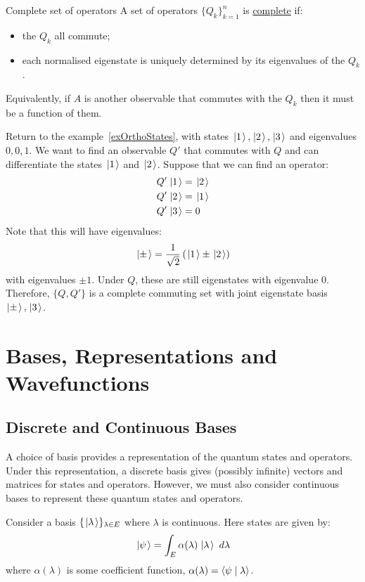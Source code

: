 \documentclass[../Main.tex]{subfiles}
\begin{document}
\begin{definition}{Complete set of operators}
    A set of operators $\{Q_k\}_{k=1}^n$ is \underline{complete} if:
    \begin{itemize}
        \item the $Q_k$ all commute;
        \item each normalised eigenstate is uniquely determined by its eigenvalues of the $Q_k$.
    \end{itemize}
\end{definition}
Equivalently, if $A$ is another observable that commutes with the $Q_k$ then it must be a function of them.
\begin{example}
    Return to the example~\ref{exOrthoStates}, with states $\left.\left|1\right.\right\rangle, \left.\left|2\right.\right\rangle, \left.\left|3\right.\right\rangle$ and eigenvalues $0, 0, 1$. We want to find an observable $Q'$ that commutes with $Q$ and can differentiate the states $\left.\left|1\right.\right\rangle$ and $\left.\left|2\right.\right\rangle$. Suppose that we can find an operator:
    \begin{align*}
        Q'\left.\left|1\right.\right\rangle &= \left.\left|2\right.\right\rangle \\
        Q'\left.\left|2\right.\right\rangle &= \left.\left|1\right.\right\rangle \\
        Q'\left.\left|3\right.\right\rangle &= 0
    \end{align*}
    Note that this will have eigenvalues:
    \begin{equation*}
        \left.\left|\pm\right.\right\rangle = \frac1{\sqrt{2}} \left(\left.\left|1\right.\right\rangle \pm \left.\left|2\right.\right\rangle\right)
    \end{equation*}
    with eigenvalues $\pm 1$. Under $Q$, these are still eigenstates with eigenvalue $0$. Therefore, $\{Q, Q'\}$ is a complete commuting set with joint eigenstate basis $\left.\left|\pm\right.\right\rangle, \left.\left|3\right.\right\rangle$.
\end{example}
\section{Bases, Representations and Wavefunctions}
\subsection{Discrete and Continuous Bases}
A choice of basis provides a representation of the quantum states and operators. Under this representation, a discrete basis gives (possibly infinite) vectors and matrices for states and operators. However, we must also consider continuous bases to represent these quantum states and operators.

Consider a basis $\{\left.\left|\lambda\right.\right\rangle\}_{\lambda \in E}$ where $\lambda$ is continuous. Here states are given by:
\begin{equation*}
    \left.\left|\psi\right.\right\rangle = \int_E \alpha(\lambda)\left.\left|\lambda\right.\right\rangle~d\lambda
\end{equation*}
where $\alpha(\lambda)$ is some coefficient function, $\alpha(\lambda) = \langle\psi\mid\lambda\rangle$.
\end{document}
